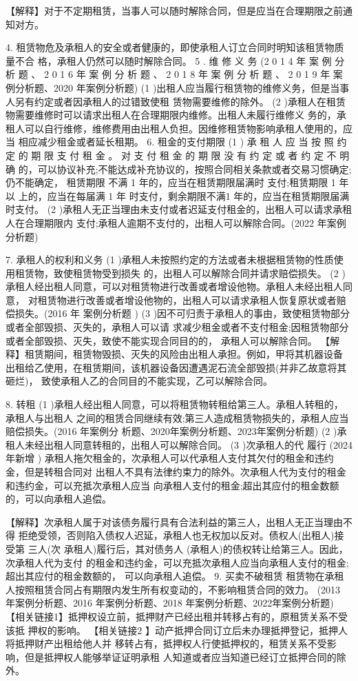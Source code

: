 \documentclass[UTF8,12pt]{ctexart}
\numberwithin{equation}{section} %
\numberwithin{figure}{section}
\numberwithin{table}{section}
\begin{document}
	【解释】对于不定期租赁，当事人可以随时解除合同，但是应当在合理期限之前通知对方。
	
	4. 租赁物危及承租人的安全或者健康的，即使承租人订立合同时明知该租赁物质量不合 格，承租人仍然可以随时解除合同。
	5 . 维 修 义 务 (2 0 1 4 年 案 例 分 析 题 、 2 0 1 6 年 案 例 分 析 题 、 2 0 1 8 年 案 例 分 析 题 、 2 0 1 9 年 案 例分析题、2020 年案例分析题)
	(1 )出租人应当履行租赁物的维修义务，但是当事人另有约定或者因承租人的过错致使租 赁物需要维修的除外。
	(2 )承租人在租赁物需要维修时可以请求出租人在合理期限内维修。出租人未履行维修义 务的，承租人可以自行维修，维修费用由出租人负担。因维修租赁物影响承租人使用的，应当 相应减少租金或者延长租期。
	6. 租金的支付期限
	(1 ) 承 租 人 应 当 按 照 约 定 的 期 限 支 付 租 金 。 对 支 付 租 金 的 期 限 没 有 约 定 或 者 约 定 不 明 确 的，可以协议补充;不能达成补充协议的，按照合同相关条款或者交易习惯确定;仍不能确定，
	租赁期限 不满 1 年的，应当在租赁期限届满时 支付;租赁期限 1 年以 上的，应当在每届满 1 年 时支付，剩余期限不满1 年的，应当在租赁期限届满时支付。
	(2 )承租人无正当理由未支付或者迟延支付租金的，出租人可以请求承租人在合理期限内 支付;承租人逾期不支付的，出租人可以解除合同。(2022 年案例分析题)
	
	7. 承租人的权利和义务
	(1 )承租人未按照约定的方法或者未根据租赁物的性质使用租赁物，致使租赁物受到损失 的，出租人可以解除合同并请求赔偿损失。
	(2 )承租人经出租人同意，可以对租赁物进行改善或者增设他物。承租人未经出租人同意， 对租赁物进行改善或者增设他物的，出租人可以请求承租人恢复原状或者赔偿损失。(2016 年 案例分析题 )
	(3 )因不可归责于承租人的事由，致使租赁物部分或者全部毁损、灭失的，承租人可以请 求减少租金或者不支付租金;因租赁物部分或者全部毁损、灭失，致使不能实现合同目的的，
	承租人可以解除合同。
	【解释】租赁期间，租赁物毁损、灭失的风险由出租人承担。例如，甲将其机器设备 出租给乙使用，在租赁期间，该机器设备因遭遇泥石流全部毁损(并非乙故意将其砸烂)，
	致使承租人乙的合同目的不能实现，乙可以解除合同。
	
	8. 转租
	(1 )承租人经出租人同意，可以将租赁物转租给第三人。承租人转租的，承租人与出租人 之间的租赁合同继续有效;第三人造成租赁物损失的，承租人应当赔偿损失。(2016 年案例分 析题、2020年案例分析题、2023年案例分析题)
	(2 )承租人未经出租人同意转租的，出租人可以解除合同。 (3 )次承租人的代 履行 (2024 年新增 )
	承租人拖欠租金的，次承租人可以代承租人支付其欠付的租金和违约金，但是转租合同对 出租人不具有法律约束力的除外。次承租人代为支付的租金和违约金，可以充抵次承租人应当 向承租人支付的租金;超出其应付的租金数额的，可以向承租人追偿。
	
	【解释】次承租人属于对该债务履行具有合法利益的第三人，出租人无正当理由不得 拒绝受领，否则陷入债权人迟延，承租人也无权加以反对。债权人(出租人)接受第 三人(次 承租人)履行后，其对债务人 (承租人)的债权转让给第三人。因此，次承租人代为支付 的租金和违约金，可以充抵次承租人应当向承租人支付的租金;超出其应付的租金数额的， 可以向承租人追偿。
	9. 买卖不破租赁 租赁物在承租人按照租赁合同占有期限内发生所有权变动的，不影响租赁合同的效力。 (2013 年案例分析题、2016 年案例分析题、2018 年案例分析题、2022年案例分析题)
	【相关链接1】抵押权设立前，抵押财产已经出租并转移占有的，原租赁关系不受该抵 押权的影响。
	【相关链接2 】动产抵押合同订立后未办理抵押登记，抵押人将抵押财产出租给他人并 移转占有，抵押权人行使抵押权的，租赁关系不受影响，但是抵押权人能够举证证明承租 人知道或者应当知道已经订立抵押合同的除外。
	
\end{document}
